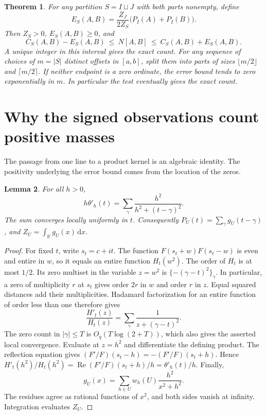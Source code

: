 \documentclass[11pt]{article}
\newtheorem{theorem}{Theorem}
\newtheorem{lemma}[theorem]{Lemma}
\newcommand{\R}{\mathbb R}
\newcommand{\Real}{\operatorname{Re}}
\newcommand{\dd}{\,\mathrm d}
\begin{document}
\begin{theorem}\label{th:count}
For any partition $S=I\sqcup J$ with both parts nonempty, define
\[
 E_S(A,B)=\frac{Z_J}{2Z_S}\big(P_I(A)+P_I(B)\big).
\]
Then $Z_S>0$, $E_S(A,B)\ge0$, and
\[
             C_S(A,B)-E_S(A,B)\ \le\ N[A,B]\ \le\ C_S(A,B)+E_S(A,B).
\]
A unique integer in this interval gives the exact count.
For any sequence of choices of $m=|S|$ distinct offsets in $[a,b]$, split
them into parts of sizes $\lfloor m/2\rfloor$ and $\lceil m/2\rceil$.
If neither endpoint is a zero ordinate, the error bound tends to zero
exponentially in $m$. In particular the test eventually gives the exact count.
\end{theorem}

\section{Why the signed observations count positive masses}
The passage from one line to a product kernel is an algebraic identity.
The positivity underlying the error bound comes from the location of the zeros.
\begin{lemma}\label{lem:phase}
For all $h>0$,
\[
 h\theta'_h(t)=\sum_\gamma\frac{h^2}{h^2+(t-\gamma)^2}.
\]
The sum converges locally uniformly in $t$. Consequently $P_U(t)=
\sum_\gamma g_U(t-\gamma)$, and $Z_U=\int_{\R}g_U(x)\dd x$.
\end{lemma}
\begin{proof}
For fixed $t$, write $s_t=c+it$. The function
$F(s_t+w)F(s_t-w)$ is even and entire in $w$, so it equals an entire
function $H_t(w^2)$. The order of $H_t$ is at most $1/2$. Its zero multiset
in the variable $z=w^2$ is $\{-(\gamma-t)^2\}_\gamma$.
In particular, a zero of multiplicity $r$ at $s_t$ gives order $2r$ in $w$
and order $r$ in $z$. Equal squared distances add their multiplicities.
Hadamard factorization for an entire function of order less than one therefore gives
\[
 \frac{H'_t(z)}{H_t(z)}
       =\sum_\gamma\frac{1}{z+(\gamma-t)^2}.
\]
The zero count in $|\gamma|\le T$ is $O_q(T\log(2+T))$, which also gives the
asserted local convergence. Evaluate at $z=h^2$ and differentiate the defining product.
The reflection equation gives
$(F'/F)(s_t-h)=-\overline{(F'/F)(s_t+h)}$.
Hence $H'_t(h^2)/H_t(h^2)=\Real(F'/F)(s_t+h)/h=\theta'_h(t)/h$.
Finally,
\[
 g_U(x)=\sum_{h\in U} w_h(U)\frac{h^2}{x^2+h^2}.
\]
The residues agree as rational functions of $x^2$, and both sides vanish
at infinity. Integration evaluates $Z_U$.
\end{proof}
\end{document}
